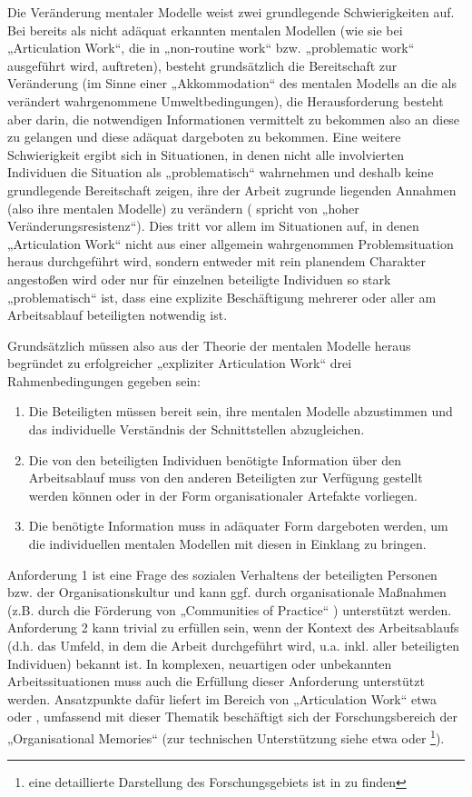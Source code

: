 Die Veränderung mentaler Modelle weist zwei grundlegende Schwierigkeiten auf. Bei bereits als nicht adäquat erkannten mentalen Modellen (wie sie bei „Articulation Work“, die in „non-routine work“ bzw. „problematic work“ ausgeführt wird, auftreten), besteht grundsätzlich die Bereitschaft zur Veränderung (im Sinne einer „Akkommodation“ des mentalen Modells an die als verändert wahrgenommene Umweltbedingungen), die Herausforderung besteht aber darin, die notwendigen Informationen vermittelt zu bekommen also an diese zu gelangen und diese adäquat dargeboten zu bekommen. Eine weitere Schwierigkeit ergibt sich in Situationen, in denen nicht alle involvierten Individuen die Situation als „problematisch“ wahrnehmen und deshalb keine grundlegende Bereitschaft zeigen, ihre der Arbeit zugrunde liegenden Annahmen (also ihre mentalen Modelle) zu verändern (\citep{Ifenthaler06} spricht von „hoher Veränderungsresistenz“). Dies tritt vor allem im Situationen auf, in denen „Articulation Work“ nicht aus einer allgemein wahrgenommen Problemsituation heraus durchgeführt wird, sondern entweder mit rein planendem Charakter angestoßen wird oder nur für einzelnen beteiligte Individuen so stark „problematisch“ ist, dass eine explizite Beschäftigung mehrerer oder aller am Arbeitsablauf beteiligten notwendig ist. 

Grundsätzlich müssen also aus der Theorie der mentalen Modelle heraus begründet zu erfolgreicher „expliziter Articulation Work“ drei Rahmenbedingungen gegeben sein:
\begin{enumerate}
	\item Die Beteiligten müssen bereit sein, ihre mentalen Modelle abzustimmen und das individuelle Verständnis der Schnittstellen abzugleichen.
	\item Die von den beteiligten Individuen benötigte Information über den Arbeitsablauf muss von den anderen Beteiligten zur Verfügung gestellt werden können oder in der Form organisationaler Artefakte vorliegen.
	\item Die benötigte Information muss in adäquater Form dargeboten werden, um  die individuellen mentalen Modellen mit diesen in Einklang zu bringen.
\end{enumerate}

Anforderung 1 ist eine Frage des sozialen Verhaltens der beteiligten Personen bzw. der Organisationskultur und kann ggf. durch organisationale Maßnahmen (z.B. durch die Förderung von „Communities of Practice“ \citep{Wenger99}) unterstützt werden. Anforderung 2 kann trivial zu erfüllen sein, wenn der Kontext des Arbeitsablaufs (d.h. das Umfeld, in dem die Arbeit durchgeführt wird, u.a. inkl. aller beteiligten Individuen) bekannt ist. In komplexen, neuartigen oder unbekannten Arbeitssituationen muss auch die Erfüllung dieser Anforderung unterstützt werden. Ansatzpunkte dafür liefert im Bereich von „Articulation Work“ etwa \citep{Grinter96} oder \citep{Fuchs01}, umfassend mit dieser Thematik beschäftigt sich der Forschungsbereich der „Organisational Memories“ (zur technischen Unterstützung siehe etwa \citep{Abecker98} oder \citep{Diefenbruch02}\footnote{eine detaillierte Darstellung des Forschungsgebiets ist in \citep{Maier08} zu finden}).

